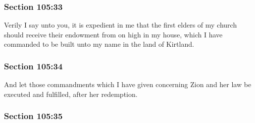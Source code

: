 
	\subsubsection{Section 105:33} %
		\label{DC105-33}

		Verily I say unto you, it is expedient in me that the first elders of my church should receive their endowment from on high in my house, which I have commanded to be built unto my name in the land of Kirtland.


	\subsubsection{Section 105:34} %
		\label{DC105-34}

		And let those commandments which I have given concerning Zion and her law be executed and fulfilled, after her redemption.


	\subsubsection{Section 105:35} %
		\label{DC105-35}

